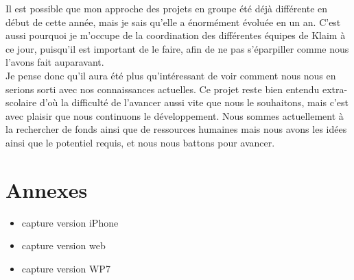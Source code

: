 \documentclass{article}
\begin{document}
		Il est possible que mon approche des projets en groupe été déjà différente en début de cette année, mais je sais qu'elle a énormément évoluée en un an. C'est aussi pourquoi je m'occupe de la coordination des différentes équipes de Klaim à ce jour, puisqu'il est important de le faire, afin de ne pas s'éparpiller comme nous l'avons fait auparavant.\\
		
		Je pense donc qu'il aura été plus qu'intéressant de voir comment nous nous en serions sorti avec nos connaissances actuelles. Ce projet reste bien entendu extra-scolaire d'où la difficulté de l'avancer aussi vite que nous le souhaitons, mais c'est avec plaisir que nous continuons le développement. Nous sommes actuellement à la rechercher de fonds ainsi que de ressources humaines mais nous avons les idées ainsi que le potentiel requis, et nous nous battons pour avancer.
	
\newpage	
\section{Annexes}
	\begin{itemize}
		\item capture version iPhone
		\item capture version web
		\item capture version WP7
	\end{itemize}
\end{document}
